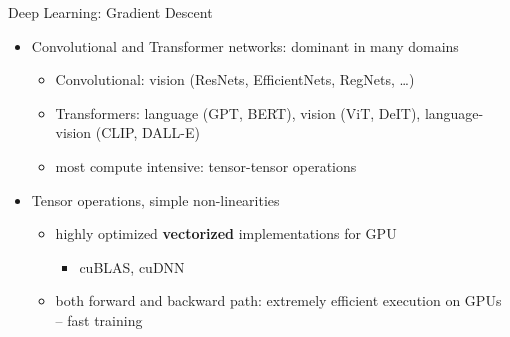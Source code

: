 \begin{frame}{Deep Learning: Gradient Descent}
\protect\hypertarget{deep-learning-gradient-descent-2}{}
\begin{itemize}
\tightlist
\item
  Convolutional and Transformer networks: dominant in many domains

  \begin{itemize}
  \tightlist
  \item
    Convolutional: vision (ResNets, EfficientNets, RegNets, \ldots)
  \item
    Transformers: language (GPT, BERT), vision (ViT, DeIT),
    language-vision (CLIP, DALL-E)
  \item
    most compute intensive: tensor-tensor operations
  \end{itemize}
\item
  Tensor operations, simple non-linearities

  \begin{itemize}
  \tightlist
  \item
    highly optimized \textbf{vectorized} implementations for GPU

    \begin{itemize}
    \tightlist
    \item
      cuBLAS, cuDNN
    \end{itemize}
  \item
    both forward and backward path: extremely efficient execution on
    GPUs -- fast training
  \end{itemize}
\end{itemize}

\end{frame}


